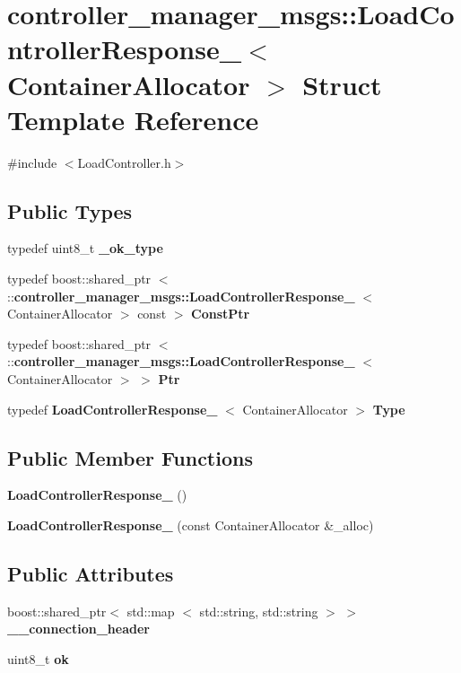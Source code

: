 \section{controller\-\_\-manager\-\_\-msgs\-:\-:\-Load\-Controller\-Response\-\_\-$<$ \-Container\-Allocator $>$ \-Struct \-Template \-Reference}
\label{structcontroller__manager__msgs_1_1LoadControllerResponse__}


{\ttfamily \#include $<$\-Load\-Controller.\-h$>$}

\subsection*{\-Public \-Types}
\begin{DoxyCompactItemize}
\item 
typedef uint8\-\_\-t {\bf \-\_\-ok\-\_\-type}
\item 
typedef boost\-::shared\-\_\-ptr\*
$<$ \-::{\bf controller\-\_\-manager\-\_\-msgs\-::\-Load\-Controller\-Response\-\_\-}\*
$<$ \-Container\-Allocator $>$ const  $>$ {\bf \-Const\-Ptr}
\item 
typedef boost\-::shared\-\_\-ptr\*
$<$ \-::{\bf controller\-\_\-manager\-\_\-msgs\-::\-Load\-Controller\-Response\-\_\-}\*
$<$ \-Container\-Allocator $>$ $>$ {\bf \-Ptr}
\item 
typedef \*
{\bf \-Load\-Controller\-Response\-\_\-}\*
$<$ \-Container\-Allocator $>$ {\bf \-Type}
\end{DoxyCompactItemize}
\subsection*{\-Public \-Member \-Functions}
\begin{DoxyCompactItemize}
\item 
{\bf \-Load\-Controller\-Response\-\_\-} ()
\item 
{\bf \-Load\-Controller\-Response\-\_\-} (const \-Container\-Allocator \&\-\_\-alloc)
\end{DoxyCompactItemize}
\subsection*{\-Public \-Attributes}
\begin{DoxyCompactItemize}
\item 
boost\-::shared\-\_\-ptr$<$ std\-::map\*
$<$ std\-::string, std\-::string $>$ $>$ {\bf \-\_\-\-\_\-connection\-\_\-header}
\item 
uint8\-\_\-t {\bf ok}
\end{DoxyCompactItemize}


